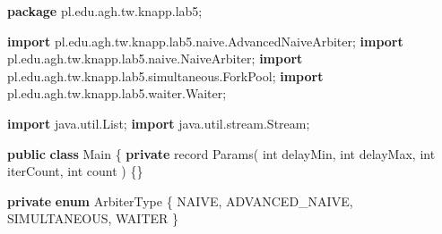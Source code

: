 \documentclass[11pt]{article}
\newenvironment{Shaded}{}{}
\newcommand{\KeywordTok}[1]{\textcolor[rgb]{0.00,0.44,0.13}{\textbf{{#1}}}}
\newcommand{\DataTypeTok}[1]{\textcolor[rgb]{0.56,0.13,0.00}{{#1}}}
\newcommand{\FunctionTok}[1]{\textcolor[rgb]{0.02,0.16,0.49}{{#1}}}
\newcommand{\NormalTok}[1]{{#1}}
\newcommand{\ImportTok}[1]{{#1}}
\newcommand{\OperatorTok}[1]{\textcolor[rgb]{0.40,0.40,0.40}{{#1}}}
\begin{document}
\begin{Shaded}
\begin{Highlighting}[]
\KeywordTok{package}\ImportTok{ pl}\OperatorTok{.}\ImportTok{edu}\OperatorTok{.}\ImportTok{agh}\OperatorTok{.}\ImportTok{tw}\OperatorTok{.}\ImportTok{knapp}\OperatorTok{.}\ImportTok{lab5}\OperatorTok{;}

\KeywordTok{import} \ImportTok{pl}\OperatorTok{.}\ImportTok{edu}\OperatorTok{.}\ImportTok{agh}\OperatorTok{.}\ImportTok{tw}\OperatorTok{.}\ImportTok{knapp}\OperatorTok{.}\ImportTok{lab5}\OperatorTok{.}\ImportTok{naive}\OperatorTok{.}\ImportTok{AdvancedNaiveArbiter}\OperatorTok{;}
\KeywordTok{import} \ImportTok{pl}\OperatorTok{.}\ImportTok{edu}\OperatorTok{.}\ImportTok{agh}\OperatorTok{.}\ImportTok{tw}\OperatorTok{.}\ImportTok{knapp}\OperatorTok{.}\ImportTok{lab5}\OperatorTok{.}\ImportTok{naive}\OperatorTok{.}\ImportTok{NaiveArbiter}\OperatorTok{;}
\KeywordTok{import} \ImportTok{pl}\OperatorTok{.}\ImportTok{edu}\OperatorTok{.}\ImportTok{agh}\OperatorTok{.}\ImportTok{tw}\OperatorTok{.}\ImportTok{knapp}\OperatorTok{.}\ImportTok{lab5}\OperatorTok{.}\ImportTok{simultaneous}\OperatorTok{.}\ImportTok{ForkPool}\OperatorTok{;}
\KeywordTok{import} \ImportTok{pl}\OperatorTok{.}\ImportTok{edu}\OperatorTok{.}\ImportTok{agh}\OperatorTok{.}\ImportTok{tw}\OperatorTok{.}\ImportTok{knapp}\OperatorTok{.}\ImportTok{lab5}\OperatorTok{.}\ImportTok{waiter}\OperatorTok{.}\ImportTok{Waiter}\OperatorTok{;}

\KeywordTok{import} \ImportTok{java}\OperatorTok{.}\ImportTok{util}\OperatorTok{.}\ImportTok{List}\OperatorTok{;}
\KeywordTok{import} \ImportTok{java}\OperatorTok{.}\ImportTok{util}\OperatorTok{.}\ImportTok{stream}\OperatorTok{.}\ImportTok{Stream}\OperatorTok{;}

\KeywordTok{public} \KeywordTok{class}\NormalTok{ Main }\OperatorTok{\{}
    \KeywordTok{private}\NormalTok{ record }\FunctionTok{Params}\OperatorTok{(}
            \DataTypeTok{int}\NormalTok{ delayMin}\OperatorTok{,}
            \DataTypeTok{int}\NormalTok{ delayMax}\OperatorTok{,}
            \DataTypeTok{int}\NormalTok{ iterCount}\OperatorTok{,}
            \DataTypeTok{int}\NormalTok{ count}
    \OperatorTok{)} \OperatorTok{\{\}}

    \KeywordTok{private} \KeywordTok{enum}\NormalTok{ ArbiterType }\OperatorTok{\{}
\NormalTok{        NAIVE}\OperatorTok{,}
\NormalTok{        ADVANCED\_NAIVE}\OperatorTok{,}
\NormalTok{        SIMULTANEOUS}\OperatorTok{,}
\NormalTok{        WAITER}
    \OperatorTok{\}}


\end{Highlighting}
\end{Shaded}
\end{document}
